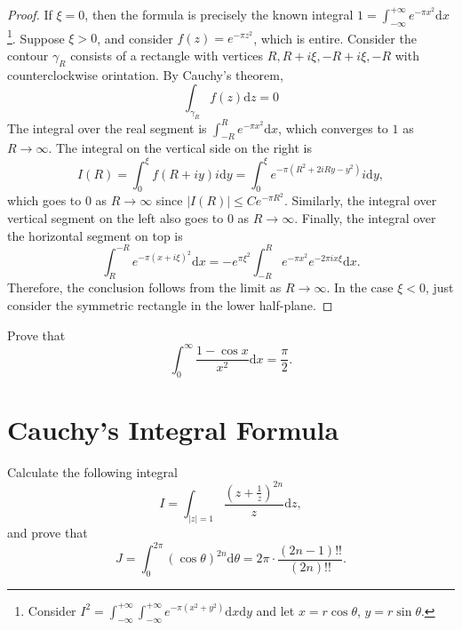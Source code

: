 \begin{proof}
  If $\xi = 0$, then the formula is precisely the known integral $1 = \int_{-\infty}^{+\infty} e^{-\pi x^2}\mathrm{d} x$
  \footnote{Consider $I^2 = \int_{-\infty}^{+\infty}\int_{-\infty}^{+\infty} e^{-\pi (x^2 + y^2)}\mathrm{d} x \mathrm{d}y$
    and let $x = r \cos \theta$, $y = r\sin \theta$.}.
  Suppose $\xi > 0$, and consider $f(z) = e^{-\pi z^2}$, which is entire.
  Consider the contour $\gamma_R$ consists of a rectangle with vertices
  $R, R+i\xi, -R+i\xi, -R$ with counterclockwise orintation.
  By Cauchy's theorem, 
  \begin{equation}
    \int_{\gamma_R} f(z)\mathrm{d} z = 0
  \end{equation}
  The integral over the real segment is $\int_{-R}^R e^{-\pi x^2} \mathrm{d} x$,
  which converges to $1$ as $R \rightarrow \infty$.
  The integral on the vertical side on the right is
  \begin{equation}
    I(R) = \int^{\xi}_0 f(R + iy)i \mathrm{d} y = \int_0^{\xi} e^{-\pi (R^2 + 2i Ry - y^2)}i \mathrm{d} y,
  \end{equation}
  which goes to $0$ as $R \rightarrow \infty$ since $|I(R)| \leq C e^{-\pi R^2}$.
  Similarly, the integral over vertical segment on the left also goes to $0$ as $R \rightarrow \infty$.
  Finally, the integral over the horizontal segment on top is
  \begin{equation}
    \int_R^{-R} e^{-\pi (x+i\xi)^2}\mathrm{d} x = - e^{\pi \xi^2} \int_{-R}^R e^{-\pi x^2}e^{-2\pi i x \xi}\mathrm{d} x.
  \end{equation}
  Therefore, the conclusion follows from the limit as $R \rightarrow \infty$.
  In the case $\xi < 0$, just consider the symmetric rectangle in the lower half-plane.
\end{proof}

\begin{exercise}{}{}
  Prove that 
  \begin{equation}
    \int_0^{\infty} \frac{1 - \cos x}{x^2}\mathrm{d} x = \frac{\pi}{2}.
  \end{equation}
\end{exercise}

\section{Cauchy's Integral Formula}

\begin{exercise}{}{}
  Calculate the following integral
  \begin{equation}
    I = \int_{|z| = 1} \frac{\left( z + \frac{1}{z} \right)^{2n}}{z} \mathrm{d} z,
  \end{equation}
  and prove that
  \begin{equation}
    J = \int_0^{2\pi} (\cos \theta)^{2n} \mathrm{d} \theta = 2 \pi \cdot \frac{(2n-1)!!}{(2n)!!}.
  \end{equation}
\end{exercise}

